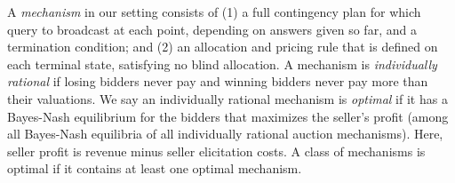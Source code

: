 \begin{definition}
  A {\em mechanism} in our setting consists of (1) a full contingency plan
  for which query to broadcast at each point, depending on answers given so
  far, and a termination condition; and (2) an allocation and pricing rule
  that is defined on each terminal state, satisfying no blind allocation.  A mechanism is {\em individually
    rational} if losing bidders never pay and winning bidders never pay
  more than their valuations.  We say an individually rational mechanism is
  {\em optimal} if it has a Bayes-Nash equilibrium for the bidders that maximizes the
  seller's profit (among all Bayes-Nash equilibria of all individually
  rational auction mechanisms).  Here, seller profit is revenue minus
  seller elicitation costs.
  A class of mechanisms is optimal if it contains at least one optimal
  mechanism.
\end{definition}
